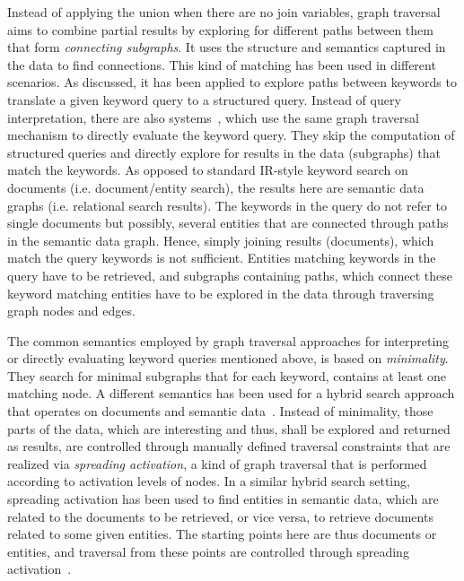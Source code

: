 	Instead of applying the union when there are no join variables, graph traversal aims to combine partial results by exploring for different paths between them that form \emph{connecting subgraphs}. It uses the structure and semantics captured in the data to find connections. This kind of matching has been used in different scenarios. As discussed, it has been applied to explore paths between keywords to translate a given keyword query to a structured query. Instead of query interpretation, there are also systems~\cite{DBLP:conf/cikm/LadwigT11}, which use the same graph traversal mechanism to directly evaluate the keyword query. They skip the computation of structured queries and directly explore for results in the data (subgraphs) that match the keywords. As opposed to standard IR-style keyword search on documents (i.e. document/entity search), the results here are semantic data graphs (i.e. relational search results). The keywords in the query do not refer to single documents but possibly, several entities that are connected through paths in the semantic data graph. Hence, simply joining results (documents), which match the query keywords is not sufficient. Entities matching keywords in the query have to be retrieved, and subgraphs containing paths, which connect these keyword matching entities have to be explored in the data through traversing graph nodes and edges. 
	
	The common semantics employed by graph traversal approaches for interpreting or directly evaluating keyword queries mentioned above, is based on \emph{minimality}. They search for minimal subgraphs that for each keyword, contains at least one matching node. A different semantics has been used for a hybrid search approach that operates on documents and semantic data~\cite{DBLP:conf/www/RochaSA04}. 
Instead of minimality, those parts of the data, which are interesting and thus, shall be explored and returned as results, are controlled through manually defined traversal constraints that are realized via \emph{spreading activation}, a kind of graph traversal that is performed according to activation levels of nodes. In a similar hybrid search setting, 
spreading activation has been used to find entities in semantic data, which are related to the documents to be retrieved, or vice versa, to retrieve documents related to some given entities. The starting points here are thus documents or entities, and traversal from these points are controlled through spreading activation~\cite{DBLP:conf/esws/SchumacherSS08}.

